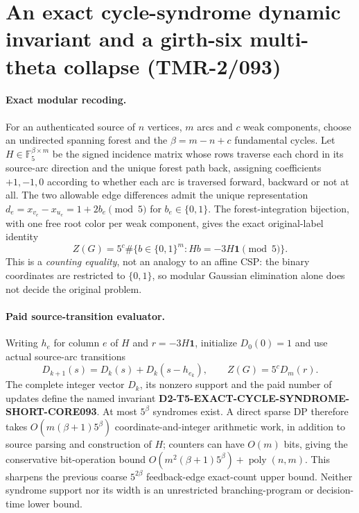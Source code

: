 \documentclass[11pt]{article}
\begin{document}
\section{An exact cycle-syndrome dynamic invariant and a girth-six multi-theta collapse (TMR-2/093)}

\paragraph{Exact modular recoding.}
For an authenticated source of $n$ vertices, $m$ arcs and $c$ weak
components, choose an undirected spanning forest and the $\beta=m-n+c$
fundamental cycles. Let
$H\in\mathbb F_5^{\beta\times m}$ be the signed incidence matrix
whose rows traverse each chord in its source-arc direction and the
unique forest path back, assigning coefficients $+1,-1,0$ according
to whether each arc is traversed forward, backward or not at all.
The two allowable edge differences admit the unique representation
$d_e=x_{v_e}-x_{u_e}=1+2b_e\pmod5$ for $b_e\in\{0,1\}$.
The forest-integration bijection, with one free root color per weak
component, gives the exact original-label identity
\[
\boxed{Z(G)=5^c\#\{b\in\{0,1\}^m:
                    Hb=-3H\mathbf1\pmod5\}.}
\]
This is a \emph{counting equality}, not an analogy to an affine CSP:
the binary coordinates are restricted to $\{0,1\}$, so modular
Gaussian elimination alone does not decide the original problem.

\paragraph{Paid source-transition evaluator.}
Writing $h_e$ for column $e$ of $H$ and $r=-3H\mathbf1$,
initialize $D_0(0)=1$ and use actual source-arc transitions
\[
D_{k+1}(s)=D_k(s)+D_k(s-h_{e_k}),\qquad
Z(G)=5^cD_m(r).
\]
The complete integer vector $D_k$, its nonzero support and the
paid number of updates define the named invariant
\textbf{D2-T5-EXACT-CYCLE-SYNDROME-SHORT-CORE093}.
At most $5^\beta$ syndromes exist. A direct sparse DP therefore
takes $O(m(\beta+1)5^\beta)$ coordinate-and-integer arithmetic work,
in addition to source parsing and construction of $H$; counters
can have $O(m)$ bits, giving the conservative bit-operation bound
$O(m^2(\beta+1)5^\beta)+\operatorname{poly}(n,m)$.
This sharpens the previous coarse $5^{2\beta}$ feedback-edge
exact-count upper bound. Neither syndrome support nor its width
is an unrestricted branching-program or decision-time lower bound.
\end{document}
